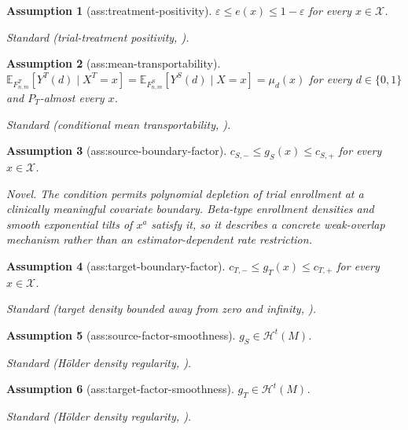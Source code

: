 \documentclass{article}
\newtheorem{assumption}{Assumption}
\begin{document}
\begin{assumption}[ass:treatment-positivity]\label{ass:treatment-positivity}
\(\varepsilon\le e(x)\le1-\varepsilon\) for every \(x\in\mathcal X\).
\par\smallskip\noindent\emph{Standard} (trial-treatment positivity, \cite{BurmanGamaloGhosalKundu2026}).
\end{assumption}

\begin{assumption}[ass:mean-transportability]\label{ass:mean-transportability}
\(\mathbb E_{F^T_{n,m}}[Y^T(d)\mid X^T=x]=\mathbb E_{F^S_{n,m}}[Y^S(d)\mid X=x]=\mu_d(x)\) for every \(d\in\{0,1\}\) and \(P_T\)-almost every \(x\).
\par\smallskip\noindent\emph{Standard} (conditional mean transportability, \cite{DahabrehRobertsonStuartEtAl2020}).
\end{assumption}

\begin{assumption}[ass:source-boundary-factor]\label{ass:source-boundary-factor}
\(c_{S,-}\le g_S(x)\le c_{S,+}\) for every \(x\in\mathcal X\).
\par\smallskip\noindent\emph{Novel.} The condition permits polynomial depletion of trial enrollment at a clinically meaningful covariate boundary. Beta-type enrollment densities and smooth exponential tilts of \(x^a\) satisfy it, so it describes a concrete weak-overlap mechanism rather than an estimator-dependent rate restriction.
\end{assumption}

\begin{assumption}[ass:target-boundary-factor]\label{ass:target-boundary-factor}
\(c_{T,-}\le g_T(x)\le c_{T,+}\) for every \(x\in\mathcal X\).
\par\smallskip\noindent\emph{Standard} (target density bounded away from zero and infinity, \cite{Tsybakov2009}).
\end{assumption}

\begin{assumption}[ass:source-factor-smoothness]\label{ass:source-factor-smoothness}
\(g_S\in\mathcal H^t(M)\).
\par\smallskip\noindent\emph{Standard} (Hölder density regularity, \cite{Tsybakov2009}).
\end{assumption}

\begin{assumption}[ass:target-factor-smoothness]\label{ass:target-factor-smoothness}
\(g_T\in\mathcal H^t(M)\).
\par\smallskip\noindent\emph{Standard} (Hölder density regularity, \cite{Tsybakov2009}).
\end{assumption}
\end{document}

